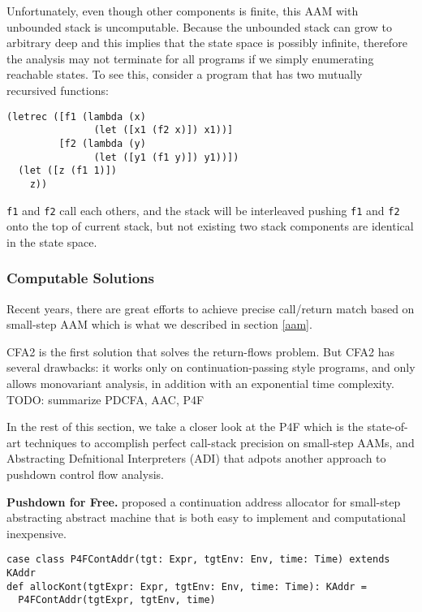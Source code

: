 \documentclass[acmsmall,review,anonymous]{acmart}\settopmatter{printfolios=true,printccs=false,printacmref=false}
\begin{document}
Unfortunately, even though other components is finite, this AAM with unbounded stack is uncomputable. 
Because the unbounded stack can grow to arbitrary deep and this implies that the state space is possibly 
infinite, therefore the analysis may not terminate for all programs if we simply enumerating 
reachable states.
To see this, consider a program that has two mutually recursived functions:

\begin{verbatim}
(letrec ([f1 (lambda (x) 
               (let ([x1 (f2 x)]) x1))]
         [f2 (lambda (y)
               (let ([y1 (f1 y)]) y1))])
  (let ([z (f1 1)])
    z))
\end{verbatim}

\texttt{f1} and \texttt{f2} call each others, and the stack will be interleaved
pushing \texttt{f1} and \texttt{f2} onto the top of current stack, but not existing 
two stack components are identical in the state space.

\subsubsection{Computable Solutions}

Recent years, there are great efforts \cite{vardoulakis2010cfa2, earl2012introspective, 
gilray2016pushdown, johnson2015abstracting} to achieve precise call/return 
match based on small-step AAM which is what we described in section \ref{aam}.

CFA2 is the first solution that solves the return-flows problem\cite{vardoulakis2010cfa2}.
But CFA2 has several drawbacks: it works only on continuation-passing style programs, 
and only allows monovariant analysis, in addition with an exponential time complexity.
TODO: summarize PDCFA, AAC, P4F

In the rest of this section, we take a closer look at the P4F which is the
state-of-art techniques to accomplish perfect call-stack precision on small-step
AAMs, and Abstracting Defnitional Interpreters (ADI) that adpots another 
approach to pushdown control flow analysis.

\textbf{Pushdown for Free.}
\citeauthor{gilray2016pushdown} proposed a continuation address allocator for 
small-step abstracting abstract machine that is both easy to implement and
computational inexpensive.

\begin{verbatim}
case class P4FContAddr(tgt: Expr, tgtEnv: Env, time: Time) extends KAddr
def allocKont(tgtExpr: Expr, tgtEnv: Env, time: Time): KAddr = 
  P4FContAddr(tgtExpr, tgtEnv, time)
\end{verbatim}
\end{document}

